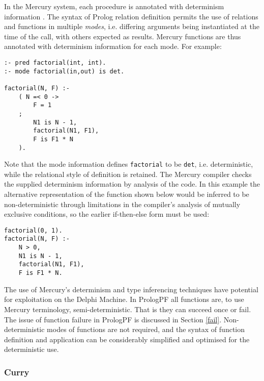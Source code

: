 In the Mercury system, each procedure is annotated with determinism
information \cite{HCSR95}. The syntax of Prolog relation definition
permits the use of relations and functions in multiple \textit{modes},
i.e. differing arguments being instantiated at the time of the call,
with others expected as results.  Mercury functions are thus annotated
with determinism information for each mode.
For example:
\begin{verbatim}
:- pred factorial(int, int).
:- mode factorial(in,out) is det.

factorial(N, F) :-
    ( N =< 0 ->
        F = 1
    ;
        N1 is N - 1,
        factorial(N1, F1),
        F is F1 * N
    ).
\end{verbatim}
Note that the mode information defines \texttt{factorial} to be
\texttt{det}, i.e. deterministic, while the relational style of 
definition is retained.
The Mercury compiler checks the supplied determinism information by
analysis of the code.  In this example the alternative representation of
the function shown below would be inferred to be non-deterministic through
limitations in the compiler's analysis of mutually exclusive conditions,
so the earlier if-then-else form must be used:
\begin{verbatim}
factorial(0, 1).
factorial(N, F) :-
    N > 0,
    N1 is N - 1,
    factorial(N1, F1),
    F is F1 * N.
\end{verbatim}
The use of Mercury's determinism and type inferencing techniques have
potential for exploitation on the Delphi Machine.  In PrologPF all
functions are, to use Mercury terminology, semi-deterministic.  That is
they can succeed once or fail.  The issue of function failure in PrologPF
is discussed in Section \ref{fail}.
Non-deterministic modes of functions are
not required, and the syntax of function definition and application can
be considerably simplified and optimised for the deterministic use.

\subsubsection{Curry}

